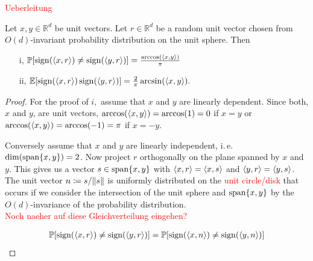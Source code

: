 \textcolor{red}{Ueberleitung}

\begin{lemma}\label{lem:G_id}
	Let $x,y\in\mathbb{R}^d$ be unit vectors. Let $r\in\mathbb{R}^d$ be a random unit vector chosen from $O(d)$-invariant probability distribution on the unit sphere. Then
	\begin{enumerate}
		\item[i,] $\mathbb{P}[\operatorname{sign}(\langle{x},{r}\rangle)\neq\operatorname{sign}(\langle{y},{r}\rangle)]=\frac{\arccos(\langle{x},{y}\rangle)}{\pi}$
		\item[ii,] $\mathbb{E}[\operatorname{sign}(\langle{x},{r}\rangle)\operatorname{sign}(\langle{y},{r}\rangle)]=\frac{2}{\pi}\arcsin(\langle{x},{y}\rangle).$
	\end{enumerate}
\end{lemma}
\begin{proof}
	For the proof of $i,$ assume that $x$ and $y$ are linearly dependent. Since both, $x$ and $y$, are unit vectors, $\arccos(\langle{x},{y}\rangle) = \arccos(1)=0$ if $x=y$ or $\arccos(\langle{x},{y}\rangle) = \arccos(-1) = \pi$ if $x=-y$.
	
	Conversely assume that $x$ and $y$ are linearly independent, i.\,e. $\operatorname{dim}(\operatorname{span}\{x,y\})=2$. Now project $r$ orthogonally on the plane spanned by $x$ and $y$. This gives us a vector $s\in \operatorname{span}\{x,y\}$ with $\langle{x},{r}\rangle = \langle{x},{s}\rangle$ and $\langle{y},{r}\rangle = \langle{y},{s}\rangle$. The unit vector $n\coloneqq s/ \Vert {s} \Vert$ is uniformly distributed on the \textcolor{red}{unit circle/disk} that occurs if we consider the intersection of the unit sphere and $\operatorname{span}\{x,y\}$ by the $O(d)$-invariance of the probability distribution. \\
	
	\textcolor{red}{Noch naeher auf diese Gleichverteilung eingehen?}
	
	\begin{align*}
		\mathbb{P}[\operatorname{sign}(\langle{x},{r}\rangle)\neq\operatorname{sign}(\langle{y},{r}\rangle)]= \mathbb{P}[\operatorname{sign}(\langle{x},{n}\rangle)\neq\operatorname{sign}(\langle{y},{n}\rangle)] 
	\end{align*} 
	

\end{proof}
